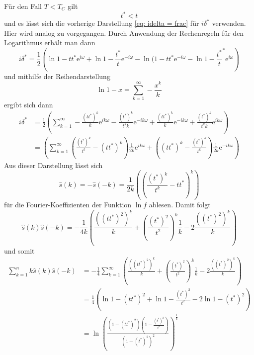 Für den Fall $T < T_C$ gilt
$$ t^* < t$$
und es lässt sich die vorherige Darstellung \eqref{eq: idelta = frac} für $i\delta^*$ verwenden. 
Hier wird analog zu \cite{Montroll_Potts_Ward} vorgegangen. Durch Anwendung der Rechenregeln für den Logarithmus erhält man dann
\begin{equation} \nonumber
i\delta^* = \frac{1}{2} \left(\ln{1-tt^*\mathrm{e}^{i\omega}} + \ln{1-\frac{t^*}{t}\mathrm{e}^{-i\omega}} - \ln{(1-tt^*\mathrm{e}^{-i\omega}} - \ln{1-\frac{t^*}{t}^*\mathrm{e}^{i\omega}} \right)
\end{equation}
und mithilfe der Reihendarstellung
\begin{equation} \nonumber 
\ln{1-x} = \sum_{k=1}^{\infty} -\frac{x^k}{k}
\end{equation}
ergibt sich dann 
\begin{align} \nonumber
i\delta^* &= \frac{1}{2} \left(  \sum_{k=1}^{\infty} -\frac{(tt^*)^k}{k}\mathrm{e}^{i k \omega} - \frac{(t^*)^k}{t^kk}\mathrm{e}^{-i k \omega} + \frac{(tt^*)^k}{k}\mathrm{e}^{-i k \omega} + \frac{(t^*)^k}{t^kk}\mathrm{e}^{i k \omega}\right) \nonumber \\
          &= \left(  \sum_{k=1}^{\infty} \left(\frac{(t^*)^k}{t^k}-(tt^*)^k\right)\frac{1}{2 k}\mathrm{e}^{i k \omega} + \left((tt^*)^k - \frac{(t^*)^k}{t^k}\right)\frac{1}{2 k}\mathrm{e}^{-i k \omega} \right)
\end{align}
Aus dieser Darstellung lässt sich
\begin{equation}  \nonumber
\hat{s}(k) = - \hat{s}(-k) = \frac{1}{2 k} \left((\frac{(t^*)^k}{t^k} - tt^*)^k\right)
\end{equation}
für die Fourier-Koeffizienten der Funktion $\ln{f}$ ablesen. Damit folgt
\begin{equation}  
\hat{s}(k)\hat{s}(-k) =  -\frac{1}{4k}\left(\frac{(( tt^*)^2)^k}{k} + \left(\frac{(t^*)^{2}}{t^{2}}\right)^k \frac{1}{k}- 2\frac{((t^*)^2)^k}{k}\right)
\end{equation}
und somit 
\begin{align} 
\sum_{k = 1}^n k \hat{s}(k)\hat{s}(-k) &= -\frac{1}{4} \sum_{k=1}^{\infty}  \left(\frac{(( tt^*)^2)^k}{k} + \left(\frac{(t^*)^{2}}{t^{2}}\right)^k \frac{1}{k}- 2\frac{((t^*)^2)^k}{k}\right) \nonumber \\
&= \frac{1}{4} \left(\ln{1-(tt^*)^2} + \ln{1-\frac{(t^*)^{2}}{t^{2}}} - 2\ln{1-(t^*)^2} \right) \nonumber \\
&= \ln{\left(\frac{(1-(tt^*)^2)(1-\frac{(t^*)^{2}}{t^{2}})}{(1-(t^*)^2)^2}\right)^{\frac{1}{4}}}  \nonumber
\end{align}
